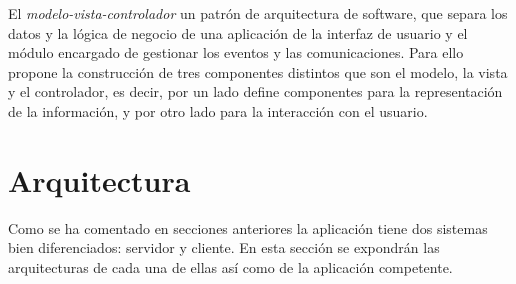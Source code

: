 El \emph{modelo-vista-controlador} un patrón de arquitectura de software, que separa los datos y la lógica de negocio de una aplicación de la interfaz de usuario y el módulo encargado de gestionar los eventos y las comunicaciones. Para ello propone la construcción de tres componentes distintos que son el modelo, la vista y el controlador, es decir, por un lado define componentes para la representación de la información, y por otro lado para la interacción con el usuario.





\section{Arquitectura}\label{arquitectura}

Como se ha comentado en secciones anteriores la aplicación tiene dos sistemas bien diferenciados: servidor y cliente. En esta sección se expondrán las arquitecturas de cada una de ellas así como de la aplicación competente.
